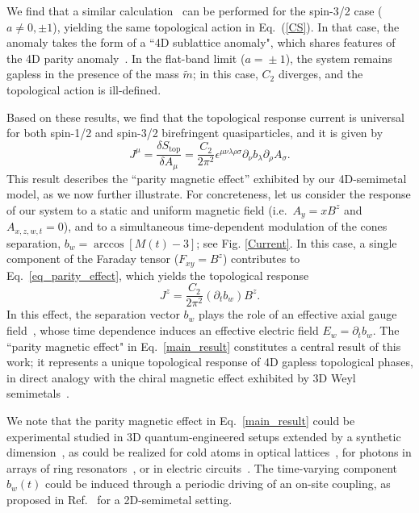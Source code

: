 \documentclass[twocolumn,prl,10pt,superscriptaddress]{revtex4}
\begin{document}
We find that a similar calculation~\cite{SM} can be performed for the spin-3/2 case ($a\!\ne\!0,\pm1$), yielding the same topological action in Eq.~(\ref{CS}). In that case, the anomaly takes the form of a ``4D sublattice anomaly", which shares features of the 4D parity anomaly~\cite{FN}. In the flat-band limit ($a\!=\!\pm1$), the system remains gapless in the presence of the mass $\tilde{m}$; in this case, $C_2$ diverges, and the topological action is ill-defined.

Based on these results, we find that the topological response current is universal for both spin-1/2 and spin-3/2  birefringent quasiparticles, and it is given by
\begin{equation}
J^{\mu}=\frac{\delta S_{\text{top}}}{\delta A_{\mu}}=\frac{C_2}{2\pi^2} \epsilon^{\mu\nu\lambda\rho\sigma} \partial_{\nu}b_{\lambda}\partial_{\rho}A_{\sigma}.\label{eq_parity_effect}
\end{equation}
This result describes the ``parity magnetic effect'' exhibited by our 4D-semimetal model, as we now further illustrate. For concreteness, let us consider the response of our system to a static and uniform magnetic field (i.e.~$A_y\!=\!xB^z$ and $A_{x,z,w,t}\!=\!0$), and to a simultaneous time-dependent modulation of the cones separation, $b_w\!=\! \arccos[M(t)-3]$; see Fig. \ref{Current}. In this case, a single component of the Faraday tensor ($F_{xy}=B^z$) contributes to Eq.~\eqref{eq_parity_effect}, which yields the topological response
\begin{equation}
J^{z}=\frac{C_2}{2\pi^2} (\partial_{t}b_{w}) B^z.\label{main_result}
\end{equation}
In this effect, the separation vector $b_{w}$ plays the role of an effective axial gauge field~\cite{Grushin2D}, whose time dependence induces an effective electric field $E_w\!=\!\partial_tb_w$.
The ``parity magnetic effect" in Eq.~\eqref{main_result} constitutes a central result of this work; it represents a unique topological response of 4D gapless topological phases, in direct analogy with the chiral magnetic effect exhibited by 3D Weyl semimetals~\cite{Burkov,Grushin,Franz,Pikulin,Grushin4, Armitage}. %

We note that the parity magnetic effect in Eq.~\eqref{main_result} could be experimental studied in 3D quantum-engineered setups extended by a synthetic dimension~\cite{Ozawa2019}, as could be realized for cold atoms in optical lattices~\cite{Goldman3}, for photons in arrays of ring resonators~\cite{Ozawa2016}, or in electric circuits~\cite{Wang2020}. The time-varying component $b_w(t)$ could be induced through a periodic driving of an on-site coupling, as proposed in Ref.~\cite{Zhu2} for a 2D-semimetal setting.
\end{document}
